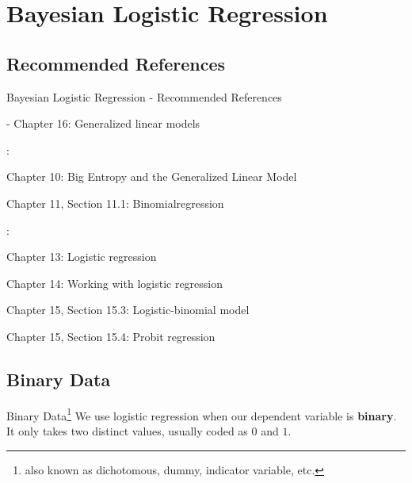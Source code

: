 
\section{Bayesian Logistic Regression}

\subsection{Recommended References}
\begin{frame}{Bayesian Logistic Regression - Recommended References}
    \begin{vfilleditems}
        \item \textcite{gelman2013bayesian} - Chapter 16: Generalized linear models
        \item \textcite{mcelreath2020statistical}:
        \begin{vfilleditems}
            \item Chapter 10: Big Entropy and the Generalized Linear Model
            \item Chapter 11, Section 11.1: Binomialregression
        \end{vfilleditems}
        \item \textcite{gelman2020regression}:
        \begin{vfilleditems}
            \item Chapter 13: Logistic regression
            \item Chapter 14: Working with logistic regression
            \item Chapter 15, Section 15.3: Logistic-binomial model
            \item Chapter 15, Section 15.4: Probit regression
        \end{vfilleditems}
    \end{vfilleditems}
\end{frame}

\subsection{Binary Data}
\begin{frame}{Binary Data\footnote{
            also known as dichotomous, dummy, indicator variable, etc.}
    }
    We use logistic regression when our dependent variable is \textbf{binary}.
    It only takes two distinct values,
    usually coded as $0$ and $1$.
\end{frame}

